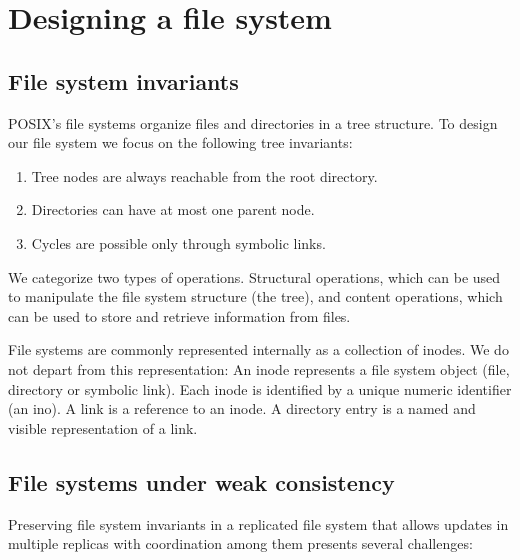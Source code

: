 \documentclass[sigconf,anonymous,10pt]{acmart}
\begin{document}
\section{Designing a file system}

\subsection{File system invariants}

POSIX's file systems organize files and directories in a tree structure.
To design our file system we focus on the following tree invariants:

\begin{enumerate}
\item Tree nodes are always reachable from the root directory.
\item Directories can have at most one parent node.
\item Cycles are possible only through symbolic links.
\end{enumerate}

We categorize two types of operations.
Structural operations, which can be used to manipulate the file system
structure (the tree), and content operations,
which can be used to store and retrieve information from files.

File systems are commonly represented internally as a collection of inodes.
We do not depart from this representation:
An inode represents a file system object (file, directory or symbolic link).
Each inode is identified by a unique numeric identifier (an ino).
A link is a reference to an inode. A directory entry is a named and visible representation of a link.

\subsection{File systems under weak consistency}
\label{fs:weak}

Preserving file system invariants in a replicated file system
that allows updates in multiple replicas with coordination
among them presents several challenges:
\end{document}
